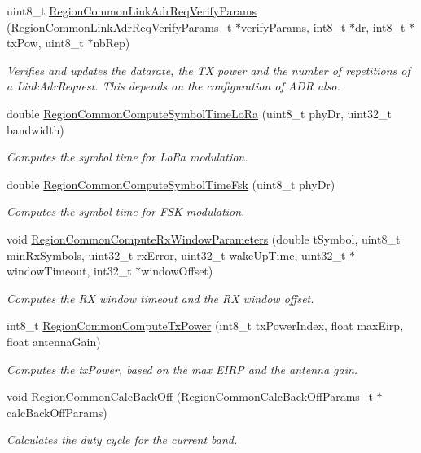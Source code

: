\begin{DoxyCompactItemize}
uint8\+\_\+t \hyperlink{group__REGIONCOMMON_ga2c87f98f09793dc7fa63a9801feeed73}{Region\+Common\+Link\+Adr\+Req\+Verify\+Params} (\hyperlink{group__REGIONCOMMON_gad186afbaf1b52893ddc3fa5eba88de0a}{Region\+Common\+Link\+Adr\+Req\+Verify\+Params\+\_\+t} $\ast$verify\+Params, int8\+\_\+t $\ast$dr, int8\+\_\+t $\ast$tx\+Pow, uint8\+\_\+t $\ast$nb\+Rep)
\begin{DoxyCompactList}\small\item\em Verifies and updates the datarate, the TX power and the number of repetitions of a Link\+Adr\+Request. This depends on the configuration of A\+DR also. \end{DoxyCompactList}\item 
double \hyperlink{group__REGIONCOMMON_ga79ed8b6555b68276d3c9ff2626b20fc8}{Region\+Common\+Compute\+Symbol\+Time\+Lo\+Ra} (uint8\+\_\+t phy\+Dr, uint32\+\_\+t bandwidth)
\begin{DoxyCompactList}\small\item\em Computes the symbol time for Lo\+Ra modulation. \end{DoxyCompactList}\item 
double \hyperlink{group__REGIONCOMMON_gacc2af896b03aa8ed8d8e5950d96d365f}{Region\+Common\+Compute\+Symbol\+Time\+Fsk} (uint8\+\_\+t phy\+Dr)
\begin{DoxyCompactList}\small\item\em Computes the symbol time for F\+SK modulation. \end{DoxyCompactList}\item 
void \hyperlink{group__REGIONCOMMON_gaba7114d0ca01f04933710feb13646138}{Region\+Common\+Compute\+Rx\+Window\+Parameters} (double t\+Symbol, uint8\+\_\+t min\+Rx\+Symbols, uint32\+\_\+t rx\+Error, uint32\+\_\+t wake\+Up\+Time, uint32\+\_\+t $\ast$window\+Timeout, int32\+\_\+t $\ast$window\+Offset)
\begin{DoxyCompactList}\small\item\em Computes the RX window timeout and the RX window offset. \end{DoxyCompactList}\item 
int8\+\_\+t \hyperlink{group__REGIONCOMMON_gaa92800c8e9ce21366d383d14878cc391}{Region\+Common\+Compute\+Tx\+Power} (int8\+\_\+t tx\+Power\+Index, float max\+Eirp, float antenna\+Gain)
\begin{DoxyCompactList}\small\item\em Computes the tx\+Power, based on the max E\+I\+RP and the antenna gain. \end{DoxyCompactList}\item 
void \hyperlink{group__REGIONCOMMON_gae2b1dfba27c79f605048f2d9869dc57d}{Region\+Common\+Calc\+Back\+Off} (\hyperlink{group__REGIONCOMMON_ga26c2fc7c3e1d929d59b5653a5cd1fc0c}{Region\+Common\+Calc\+Back\+Off\+Params\+\_\+t} $\ast$calc\+Back\+Off\+Params)
\begin{DoxyCompactList}\small\item\em Calculates the duty cycle for the current band. \end{DoxyCompactList}\end{DoxyCompactItemize}


